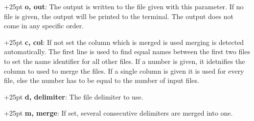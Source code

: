 \documentclass[a4paper,10pt,parskip=half]{scrreprt}
\begin{document}
\hangindent+25pt 
\textbf{o, out}: The output is written to the file given with this parameter. If
no file is given, the output will be printed to the terminal. The output does
not come in any specific order.

\hangindent+25pt 
\textbf{c, col}: If not set the column which is merged is used merging is
detected automatically. The first line is used to find equal names between the
first two files to set the name identifier for all other files. 
If a number is given, it idetnifies the column to used to merge the files. If a single column is given it is used for every file, else the number has to be equal to the number of input files.

\hangindent+25pt 
\textbf{d, delimiter}: The file delimiter to use. 

\hangindent+25pt 
\textbf{m, merge}: If set, several consecutive delimiters are merged into one.
\end{document}
